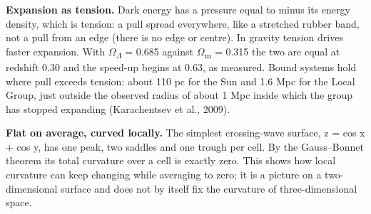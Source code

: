 \documentclass[
  11pt,
]{article}
\begin{document}
\textbf{Expansion as tension.} Dark energy has a pressure equal to minus its energy density, which is tension: a pull spread everywhere, like a stretched rubber band, not a pull from an edge (there is no edge or centre). In gravity tension drives faster expansion. With \ensuremath{\Omega}\textsubscript{\ensuremath{\Lambda}} = 0.685 against \ensuremath{\Omega}\textsubscript{m} = 0.315 the two are equal at redshift 0.30 and the speed-up begins at 0.63, as measured. Bound systems hold where pull exceeds tension: about 110 pc for the Sun and 1.6 Mpc for the Local Group, just outside the observed radius of about 1 Mpc inside which the group has stopped expanding (Karachentsev et al., 2009).

\textbf{Flat on average, curved locally.} The simplest crossing-wave surface, z = cos x + cos y, has one peak, two saddles and one trough per cell. By the Gauss--Bonnet theorem its total curvature over a cell is exactly zero. This shows how local curvature can keep changing while averaging to zero; it is a picture on a two-dimensional surface and does not by itself fix the curvature of three-dimensional space.
\end{document}

